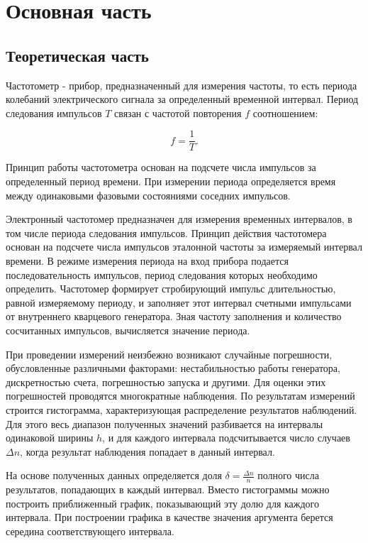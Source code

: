 \documentclass[a4paper,14pt]{extarticle}
\theoremstyle{plain}
\theoremstyle{remark}
\theoremstyle{definition}
\begin{document}
\newpage

\section{Основная часть}

\subsection{Теоретическая часть}

Частотометр - прибор, предназначенный для измерения частоты, то есть периода колебаний электрического сигнала за определенный временной интервал. 
Период следования импульсов \(T\) связан с частотой повторения \(f\) соотношением:

\begin{equation}
f = \frac{1}{T}.
\end{equation}

Принцип работы частотометра основан на подсчете числа импульсов за определенный период времени. При измерении периода определяется время между одинаковыми фазовыми состояниями соседних импульсов.

Электронный частотомер предназначен для измерения временных интервалов, в том числе периода следования импульсов. Принцип действия частотомера основан на подсчете числа импульсов эталонной частоты за измеряемый интервал времени. В режиме измерения периода на вход прибора подается последовательность импульсов, период следования которых необходимо определить. Частотомер формирует стробирующий импульс длительностью, равной измеряемому периоду, и заполняет этот интервал счетными импульсами от внутреннего кварцевого генератора. Зная частоту заполнения и количество сосчитанных импульсов, вычисляется значение периода.

При проведении измерений неизбежно возникают случайные погрешности, обусловленные различными факторами: нестабильностью работы генератора, дискретностью счета, погрешностью запуска и другими. Для оценки этих погрешностей проводятся многократные наблюдения. По результатам измерений строится гистограмма, характеризующая распределение результатов наблюдений. Для этого весь диапазон полученных значений разбивается на интервалы одинаковой ширины $h$, и для каждого интервала подсчитывается число случаев $\Delta n$, когда результат наблюдения попадает в данный интервал.

На основе полученных данных определяется доля $\delta = \frac{\Delta n}{n}$ полного числа результатов, попадающих в каждый интервал. Вместо гистограммы можно построить приближенный график, показывающий эту долю для каждого интервала. При построении графика в качестве значения аргумента берется середина соответствующего интервала.
\end{document}

